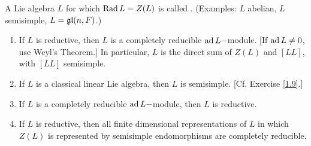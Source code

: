 \begin{ex}\label{6.5}
  A Lie algebra $L$ for which $\operatorname{Rad} L = Z(L)$ is called . (Examples: $L$ abelian, $L$ semisimple, $L = \mathfrak{g}\mathfrak{l}(n,F)$.)
  \begin{enumerate}
    \item If $L$ is reductive, then $L$ is a completely reducible $\operatorname{ad} L-$module. [If $\operatorname{ad} L \neq 0$, use Weyl's Theorem.] In particular, $L$ is the direct sum of $Z(L)$ and $[LL]$, with $[LL]$ semisimple.
    \item If $L$ is a classical linear Lie algebra, then $L$ is semisimple. [Cf. Exercise \ref{1.9}.]
    \item If $L$ is a completely reducible $\operatorname{ad} L-$module, then $L$ is reductive.
    \item If $L$ is reductive, then all finite dimensional representations of $L$ in which $Z(L)$ is represented by semisimple endomorphisms are completely reducible.
  \end{enumerate}
\end{ex}
